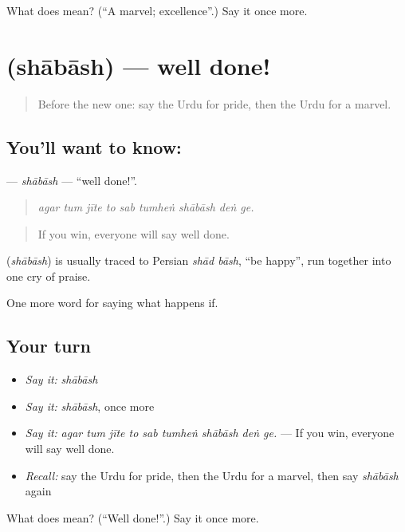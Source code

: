 \begin{tcolorbox}[breakable,colback=teal!4,colframe=teal!35!black,title={Before you move on}]
What does  mean? (\textquotedblleft{}A marvel; excellence\textquotedblright{}.) Say it once more.
\end{tcolorbox}
\section[\texorpdfstring{\ur{شاباش} (shābāsh)}{شاباش (shābāsh)}]{ (shābāsh) — well done!}

\label{lesson:UR-C381-shabash}



\begin{quote}
Before the new one: say the Urdu for pride, then the Urdu for a marvel.
\end{quote}

\subsection*{You'll want to know: }
\textbf{} — \emph{shābāsh} — \textquotedblleft{}well done!\textquotedblright{}.

\begin{quote}
        
\end{quote}

\begin{quote}
\emph{agar tum jīte to sab tumheṅ shābāsh deṅ ge.}
\end{quote}

\begin{quote}
If you win, everyone will say well done.
\end{quote}

\begin{cousinweb}
\textbf{} (\emph{shābāsh}) is usually traced to Persian \emph{shād bāsh}, \textquotedblleft{}be happy\textquotedblright{}, run together into one cry of praise.
\end{cousinweb}

\begin{grammarlens}[title={What you've built}]
One more word for saying what happens if.
\end{grammarlens}

\subsection*{Your turn}
\begin{itemize}
\raggedright
  \item \emph{Say it:} \emph{shābāsh}
  \item \emph{Say it:} \emph{shābāsh}, once more
  \item \emph{Say it:} \emph{agar tum jīte to sab tumheṅ shābāsh deṅ ge.} — If you win, everyone will say well done.
  \item \emph{Recall:} say the Urdu for pride, then the Urdu for a marvel, then say \emph{shābāsh} again
\end{itemize}

\begin{tcolorbox}[breakable,colback=teal!4,colframe=teal!35!black,title={Before you move on}]
What does  mean? (\textquotedblleft{}Well done!\textquotedblright{}.) Say it once more.
\end{tcolorbox}
